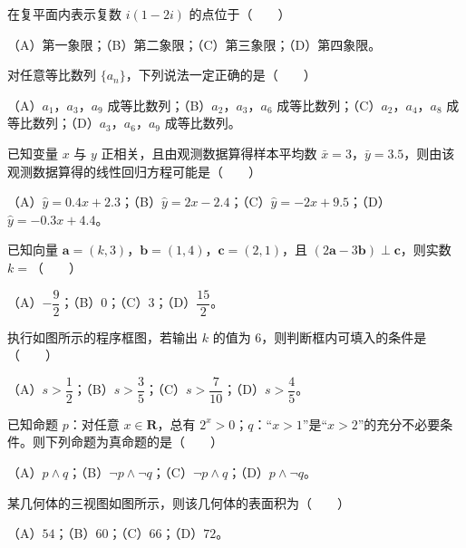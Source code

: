 \begin{question}
在复平面内表示复数 $i(1-2i)$ 的点位于\mbox{（　　）}

（A）第一象限；（B）第二象限；（C）第三象限；（D）第四象限。

\end{question}
\begin{question}
对任意等比数列 $\{a_n\}$，下列说法一定正确的是\mbox{（　　）}

（A）$a_1$，$a_3$，$a_9$ 成等比数列；（B）$a_2$，$a_3$，$a_6$ 成等比数列；（C）$a_2$，$a_4$，$a_8$ 成等比数列；（D）$a_3$，$a_6$，$a_9$ 成等比数列。

\end{question}
\begin{question}
已知变量 $x$ 与 $y$ 正相关，且由观测数据算得样本平均数 $\bar x=3$，$\bar y=3.5$，则由该观测数据算得的线性回归方程可能是\mbox{（　　）}

（A）$\hat y=0.4x+2.3$；（B）$\hat y=2x-2.4$；（C）$\hat y=-2x+9.5$；（D）$\hat y=-0.3x+4.4$。

\end{question}
\begin{question}
已知向量 $\boldsymbol a=(k,3)$，$\boldsymbol b=(1,4)$，$\boldsymbol c=(2,1)$，且 $(2\boldsymbol a-3\boldsymbol b)\perp\boldsymbol c$，则实数 $k=$\mbox{（　　）}

（A）$-\dfrac92$；（B）$0$；（C）$3$；（D）$\dfrac{15}2$。

\Needspace{0.4\textheight}
\end{question}
\begin{question}
执行如图所示的程序框图，若输出 $k$ 的值为 $6$，则判断框内可填入的条件是\mbox{（　　）}

（A）$s>\dfrac12$；（B）$s>\dfrac35$；（C）$s>\dfrac7{10}$；（D）$s>\dfrac45$。
\nopagebreak[4]
\begin{center}\end{center}
\nopagebreak[4]
\end{question}
\begin{question}
已知命题 $p$：对任意 $x\in\mathbf R$，总有 $2^x>0$；$q$：“$x>1$”是“$x>2$”的充分不必要条件。则下列命题为真命题的是\mbox{（　　）}

（A）$p\wedge q$；（B）$\neg p\wedge\neg q$；（C）$\neg p\wedge q$；（D）$p\wedge\neg q$。

\Needspace{0.4\textheight}
\end{question}
\begin{question}
某几何体的三视图如图所示，则该几何体的表面积为\mbox{（　　）}

（A）$54$；（B）$60$；（C）$66$；（D）$72$。
\nopagebreak[4]
\begin{center}\end{center}
\nopagebreak[4]
\end{question}
